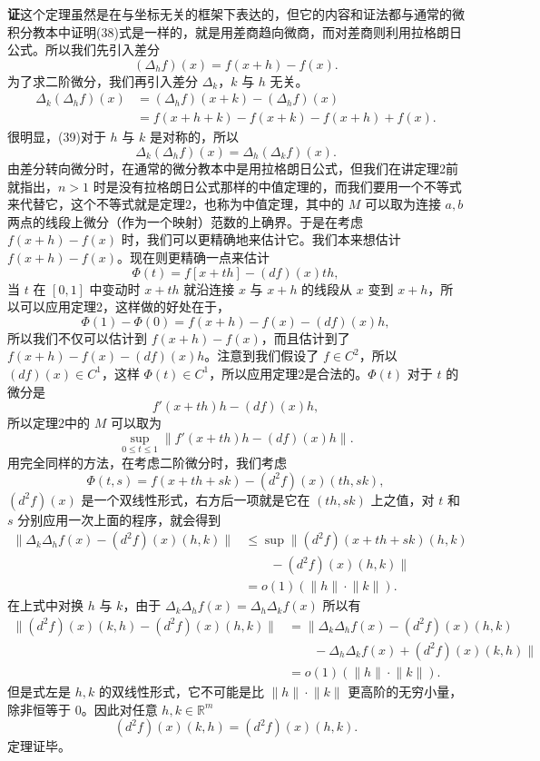 \noindent\textbf{证}\quad 这个定理虽然是在与坐标无关的框架下表达的，但它的内容和证法都与通常的微积分教本中证明(38)式是一样的，就是用差商趋向微商，而对差商则利用拉格朗日公式。所以我们先引入差分
\[
 (\Delta_hf)(x)=f(x+h)-f(x).
\]
为了求二阶微分，我们再引入差分 $\Delta_k$，$k$ 与 $h$ 无关。
\begin{align}
 \Delta_k(\Delta_hf)(x)
 &=(\Delta_hf)(x+k)-(\Delta_hf)(x)\\
 &=f(x+h+k)-f(x+k)-f(x+h)+f(x).
 \tag{39}
\end{align}
很明显，(39)对于 $h$ 与 $k$ 是对称的，所以
\[
 \Delta_k(\Delta_hf)(x)=\Delta_h(\Delta_kf)(x).
\]
由差分转向微分时，在通常的微分教本中是用拉格朗日公式，但我们在讲定理2前就指出，$n>1$ 时是没有拉格朗日公式那样的中值定理的，而我们要用一个不等式来代替它，这个不等式就是定理2，也称为中值定理，其中的 $M$ 可以取为连接 $a,b$ 两点的线段上微分（作为一个映射）范数的上确界。于是在考虑 $f(x+h)-f(x)$ 时，我们可以更精确地来估计它。我们本来想估计 $f(x+h)-f(x)$。现在则更精确一点来估计
\[
 \Phi(t)=f[x+th]-(df)(x)th,
\]
当 $t$ 在 $[0,1]$ 中变动时 $x+th$ 就沿连接 $x$ 与 $x+h$ 的线段从 $x$ 变到 $x+h$，所以可以应用定理2，这样做的好处在于，
\[
 \Phi(1)-\Phi(0)=f(x+h)-f(x)-(df)(x)h,
\]
所以我们不仅可以估计到 $f(x+h)-f(x)$，而且估计到了 $f(x+h)-f(x)-(df)(x)h$。注意到我们假设了 $f\in C^2$，所以 $(df)(x)\in C^1$，这样 $\Phi(t)\in C^1$，所以应用定理2是合法的。$\Phi(t)$ 对于 $t$ 的微分是
\[
 f'(x+th)h-(df)(x)h,
\]
所以定理2中的 $M$ 可以取为
\[
 \sup_{0\le t\le1}\lVert f'(x+th)h-(df)(x)h\rVert.
\]
用完全同样的方法，在考虑二阶微分时，我们考虑
\[
 \Phi(t,s)=f(x+th+sk)-(d^2f)(x)(th,sk),
\]
$(d^2f)(x)$ 是一个双线性形式，右方后一项就是它在 $(th,sk)$ 上之值，对 $t$ 和 $s$ 分别应用一次上面的程序，就会得到
\begin{align*}
 \bigl\lVert\Delta_k\Delta_hf(x)-(d^2f)(x)(h,k)\bigr\rVert
 &\le \sup\bigl\lVert(d^2f)(x+th+sk)(h,k)\\
 &\qquad -(d^2f)(x)(h,k)\bigr\rVert\\
 &=o(1)(\lVert h\rVert\cdot\lVert k\rVert).
\end{align*}
在上式中对换 $h$ 与 $k$，由于 $\Delta_k\Delta_hf(x)=\Delta_h\Delta_kf(x)$ 所以有
\begin{align*}
 \bigl\lVert(d^2f)(x)(k,h)-(d^2f)(x)(h,k)\bigr\rVert
 &=\bigl\lVert\Delta_k\Delta_hf(x)-(d^2f)(x)(h,k)\\
 &\qquad-\Delta_h\Delta_kf(x)+(d^2f)(x)(k,h)\bigr\rVert\\
 &=o(1)(\lVert h\rVert\cdot\lVert k\rVert).
\end{align*}
但是式左是 $h,k$ 的双线性形式，它不可能是比 $\lVert h\rVert\cdot\lVert k\rVert$ 更高阶的无穷小量，除非恒等于 0。因此对任意 $h,k\in\mathbb R^m$
\[
 (d^2f)(x)(k,h)=(d^2f)(x)(h,k).
\]
定理证毕。

